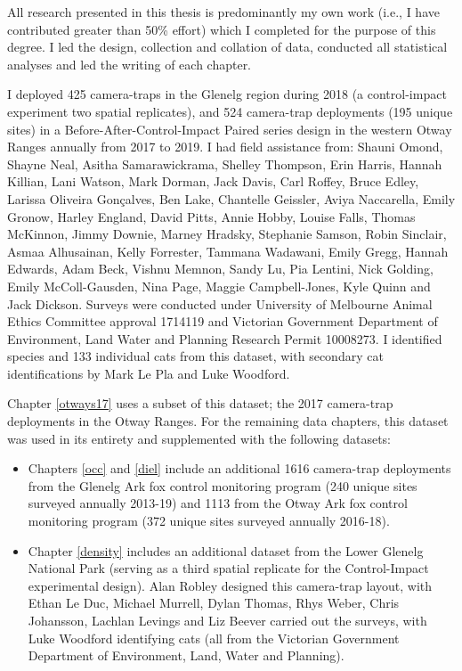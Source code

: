 \documentclass[11pt,a4paper,titlepage,twoside,openright]{style/unimelbthesis}
\begin{document}
\begin{frontmatter}
\begin{preface}
    All research presented in this thesis is predominantly my own work (i.e., I have contributed greater than 50\% effort) which I completed for the purpose of this degree. I led the design, collection and collation of data, conducted all statistical analyses and led the writing of each chapter.
    
    I deployed 425 camera-traps in the Glenelg region during 2018 (a control-impact experiment two spatial replicates), and 524 camera-trap deployments (195 unique sites) in a Before-After-Control-Impact Paired series design in the western Otway Ranges annually from 2017 to 2019. I had field assistance from: Shauni Omond, Shayne Neal, Asitha Samarawickrama, Shelley Thompson, Erin Harris, Hannah Killian, Lani Watson, Mark Dorman, Jack Davis, Carl Roffey, Bruce Edley, Larissa Oliveira Gonçalves, Ben Lake, Chantelle Geissler, Aviya Naccarella, Emily Gronow, Harley England, David Pitts, Annie Hobby, Louise Falls, Thomas McKinnon, Jimmy Downie, Marney Hradsky, Stephanie Samson, Robin Sinclair, Asmaa Alhusainan, Kelly Forrester, Tammana Wadawani, Emily Gregg, Hannah Edwards, Adam Beck, Vishnu Memnon, Sandy Lu, Pia Lentini, Nick Golding, Emily McColl-Gausden, Nina Page, Maggie Campbell-Jones, Kyle Quinn and Jack Dickson. Surveys were conducted under University of Melbourne Animal Ethics Committee approval 1714119 and Victorian Government Department of Environment, Land Water and Planning Research Permit 10008273. I identified species and 133 individual cats from this dataset, with secondary cat identifications by Mark Le Pla and Luke Woodford.
    
    Chapter \ref{otways17} uses a subset of this dataset; the 2017 camera-trap deployments in the Otway Ranges. For the remaining data chapters, this dataset was used in its entirety and supplemented with the following datasets:
    \begin{itemize}
    \item
      Chapters \ref{occ} and \ref{diel} include an additional 1616 camera-trap deployments from the Glenelg Ark fox control monitoring program (240 unique sites surveyed annually 2013-19) and 1113 from the Otway Ark fox control monitoring program (372 unique sites surveyed annually 2016-18).
    \item
      Chapter \ref{density} includes an additional dataset from the Lower Glenelg National Park (serving as a third spatial replicate for the Control-Impact experimental design). Alan Robley designed this camera-trap layout, with Ethan Le Duc, Michael Murrell, Dylan Thomas, Rhys Weber, Chris Johansson, Lachlan Levings and Liz Beever carried out the surveys, with Luke Woodford identifying cats (all from the Victorian Government Department of Environment, Land, Water and Planning).
    \end{itemize}
    \(~\)
    

\end{preface}
\end{frontmatter}
\end{document}
